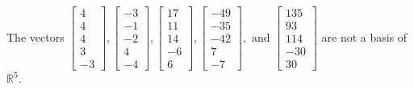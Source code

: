 \begin{exercise}
\begin{exerciseStatement}
  \end{exerciseStatement}
  \begin{exerciseAnswer}
   The vectors \(\left[\begin{array}{r}
4 \\
4 \\
4 \\
3 \\
-3
\end{array}\right] , \left[\begin{array}{r}
-3 \\
-1 \\
-2 \\
4 \\
-4
\end{array}\right] , \left[\begin{array}{r}
17 \\
11 \\
14 \\
-6 \\
6
\end{array}\right] , \left[\begin{array}{r}
-49 \\
-35 \\
-42 \\
7 \\
-7
\end{array}\right] , \text{ and } \left[\begin{array}{r}
135 \\
93 \\
114 \\
-30 \\
30
\end{array}\right]\) 
  	 are not  a basis of \(\mathbb{R}^5\).
  


  \end{exerciseAnswer}
\end{exercise}